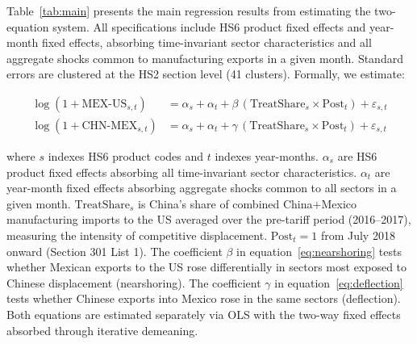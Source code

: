 \documentclass[11pt]{article}
\begin{document}
Table~\ref{tab:main} presents the main regression results from estimating
the two-equation system. All specifications include HS6 product fixed
effects and year-month fixed effects, absorbing time-invariant sector
characteristics and all aggregate shocks common to manufacturing exports
in a given month. Standard errors are clustered at the HS2 section level
(41 clusters). Formally, we estimate:

\begin{align}
\log(1 + \mathrm{MEX\text{-}US}_{s,t}) &=
  \alpha_s + \alpha_t +
  \beta\,(\mathrm{TreatShare}_s \times \mathrm{Post}_t)
  + \varepsilon_{s,t}
  \label{eq:nearshoring} \\[6pt]
\log(1 + \mathrm{CHN\text{-}MEX}_{s,t}) &=
  \alpha_s + \alpha_t +
  \gamma\,(\mathrm{TreatShare}_s \times \mathrm{Post}_t)
  + \varepsilon_{s,t}
  \label{eq:deflection}
\end{align}

\noindent where $s$ indexes HS6 product codes and $t$ indexes year-months.
$\alpha_s$ are HS6 product fixed effects absorbing all time-invariant
sector characteristics. $\alpha_t$ are year-month fixed effects absorbing
aggregate shocks common to all sectors in a given month.
$\mathrm{TreatShare}_s$ is China's share of combined China$+$Mexico
manufacturing imports to the US averaged over the pre-tariff period
(2016--2017), measuring the intensity of competitive displacement.
$\mathrm{Post}_t = 1$ from July 2018 onward (Section 301 List 1).
The coefficient $\beta$ in equation~\eqref{eq:nearshoring} tests whether
Mexican exports to the US rose differentially in sectors most exposed to
Chinese displacement (nearshoring). The coefficient $\gamma$ in
equation~\eqref{eq:deflection} tests whether Chinese exports into Mexico
rose in the same sectors (deflection). Both equations are estimated
separately via OLS with the two-way fixed effects absorbed through
iterative demeaning.
\end{document}
